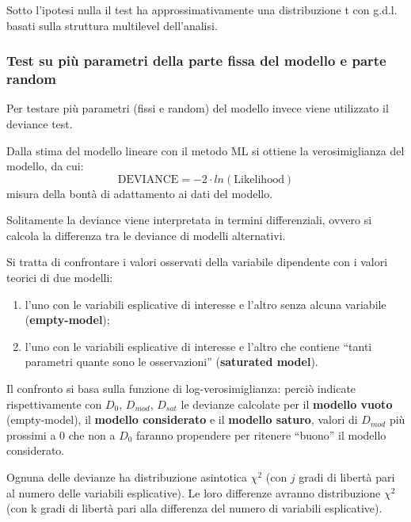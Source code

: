 \documentclass[a4page, 11pt]{article} %
\begin{document}
Sotto l’ipotesi nulla il test ha approssimativamente una distribuzione t con g.d.l. basati sulla struttura multilevel dell’analisi. 
\subsubsection*{Test su più parametri della parte fissa del modello e parte random}
Per testare più parametri (fissi e random) del modello invece viene utilizzato il deviance test. 

Dalla stima del modello lineare con il metodo ML si ottiene la verosimiglianza del modello, da cui: 
\begin{equation*}
\mathrm{DEVIANCE} = -2 \cdot ln(\mathrm{Likelihood}) 
\end{equation*}
misura della bontà di adattamento ai dati del modello.

Solitamente la deviance viene interpretata in termini differenziali, ovvero si calcola la differenza tra le deviance di modelli alternativi. 

Si tratta di confrontare i valori osservati della variabile dipendente con i valori teorici di due modelli: 
\begin{enumerate}[noitemsep]
\item l'uno con le variabili esplicative di interesse e l’altro senza alcuna variabile (\textbf{empty-model}); 
\item l'uno con le variabili esplicative di interesse e l’altro che contiene “tanti parametri quante sono le osservazioni” (\textbf{saturated model}).
\end{enumerate}
Il confronto si basa sulla funzione di log-verosimiglianza: perciò indicate rispettivamente con $D_0$, $D_{mod}$, $D_{sat}$ le devianze calcolate per il \textbf{modello vuoto} (empty-model), il \textbf{modello considerato} e il \textbf{modello saturo}, valori di $D_{mod}$ più prossimi a $0$ che non a $D_0$ faranno propendere per ritenere “buono” il modello considerato. 

Ognuna delle devianze ha distribuzione asintotica $\chi^2$ (con $j$ gradi di libertà pari al numero delle variabili esplicative). Le loro differenze avranno distribuzione $\chi^2$ (con k gradi di libertà pari alla differenza del numero di variabili esplicative).
\end{document}

